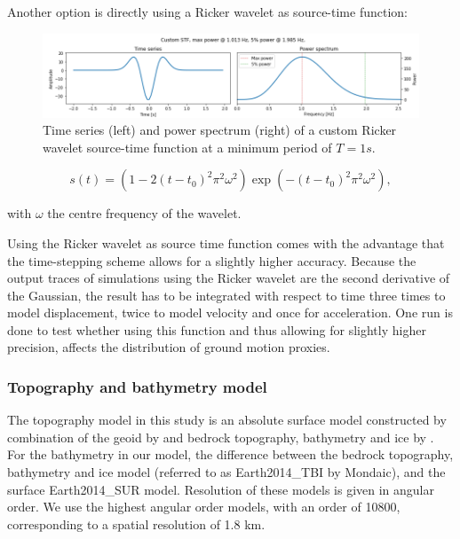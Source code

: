 \documentclass[../Text/00main.tex]{subfiles}
\begin{document}
Another option is directly using a Ricker wavelet as source-time function:

\begin{figure}[h!]
    \centering
    \includegraphics{images_methods/custom_stf.png}
    \caption{Time series (left) and power spectrum (right) of a custom Ricker wavelet source-time function at a minimum period of $ T=1 s$.}
    \label{fig:Custom_stf}
    \label{eq:custom}
\end{figure}



\begin{equation}
s(t)=\left(1-2\left(t-t_{0}\right)^{2} \pi^{2} \omega^{2}\right) \exp \left(-\left(t-t_{0}\right)^{2} \pi^{2} \omega^{2}\right),
\end{equation}

with $\omega$ the centre frequency of the wavelet.


Using the Ricker wavelet as source time function comes with the advantage that the time-stepping scheme allows for a slightly higher accuracy. Because the output traces of simulations using the Ricker wavelet are the second derivative of the Gaussian, the result has to be integrated with respect to time three times to model displacement, twice to model velocity and once for acceleration. One run is done to test whether using this function and thus allowing for slightly higher precision, affects the distribution of ground motion proxies. 

\subsubsection{Topography and bathymetry model}



The topography model in this study is an absolute surface model constructed by combination of the geoid by \cite{pavlis2012development} and bedrock topography, bathymetry and ice by \cite{hirt2015earth2014}. For the bathymetry in our model, the difference between the bedrock topography, bathymetry and ice model (referred to as Earth2014\_TBI by Mondaic), and the surface Earth2014\_SUR model. Resolution of these models is given in angular order. We use the highest angular order models, with an order of 10800, corresponding to a spatial resolution of 1.8 km. 
\end{document}
